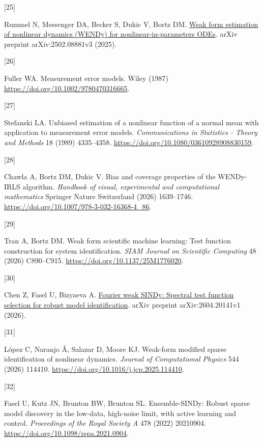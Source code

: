 \documentclass[ejs]{imsart}
\newlength{\cslhangindent}\setlength{\cslhangindent}{1.5em}
\newlength{\csllabelwidth}\setlength{\csllabelwidth}{3em}
\newenvironment{CSLReferences}[2]
 {\begin{list}{}{\setlength{\itemindent}{0pt}\setlength{\leftmargin}{0pt}\setlength{\parsep}{0pt}
 \ifodd #1\setlength{\leftmargin}{\cslhangindent}\setlength{\itemindent}{-1\cslhangindent}\fi
 \setlength{\itemsep}{#2\baselineskip}}}{\end{list}}
\newcommand{\CSLLeftMargin}[1]{\parbox[t]{\csllabelwidth}{\strut#1\strut}}
\newcommand{\CSLRightInline}[1]{\parbox[t]{\linewidth-\csllabelwidth}{\strut#1\strut}}
\begin{document}
\begin{CSLReferences}{0}{0}
\CSLLeftMargin{{[}25{]} }%
\CSLRightInline{Rummel N, Messenger DA, Becker S, Dukic V, Bortz DM.
\href{https://arxiv.org/abs/2502.08881v3}{Weak form estimation of
nonlinear dynamics ({WENDy}) for nonlinear-in-parameters {ODEs}}. arXiv
preprint arXiv:2502.08881v3 (2025).}

\CSLLeftMargin{{[}26{]} }%
\CSLRightInline{Fuller WA. Measurement error models. Wiley (1987)
\url{https://doi.org/10.1002/9780470316665}.}

\CSLLeftMargin{{[}27{]} }%
\CSLRightInline{Stefanski LA. Unbiased estimation of a nonlinear
function of a normal mean with application to measurement error models.
\emph{Communications in Statistics - Theory and Methods} 18 (1989)
4335--4358. \url{https://doi.org/10.1080/03610928908830159}.}

\CSLLeftMargin{{[}28{]} }%
\CSLRightInline{Chawla A, Bortz DM, Dukic V. Bias and coverage
properties of the {WENDy-IRLS} algorithm. \emph{Handbook of visual,
experimental and computational mathematics} Springer Nature Switzerland
(2026) 1639--1746. \url{https://doi.org/10.1007/978-3-032-16368-4_86}.}

\CSLLeftMargin{{[}29{]} }%
\CSLRightInline{Tran A, Bortz DM. Weak form scientific machine learning:
Test function construction for system identification. \emph{SIAM Journal
on Scientific Computing} 48 (2026) C890--C915.
\url{https://doi.org/10.1137/25M1776020}.}

\CSLLeftMargin{{[}30{]} }%
\CSLRightInline{Chen Z, Fasel U, Bizyaeva A.
\href{https://arxiv.org/abs/2604.20141v1}{Fourier weak {SINDy}: Spectral
test function selection for robust model identification}. arXiv preprint
arXiv:2604.20141v1 (2026).}

\CSLLeftMargin{{[}31{]} }%
\CSLRightInline{López C, Naranjo Á, Salazar D, Moore KJ. Weak-form
modified sparse identification of nonlinear dynamics. \emph{Journal of
Computational Physics} 544 (2026) 114410.
\url{https://doi.org/10.1016/j.jcp.2025.114410}.}

\CSLLeftMargin{{[}32{]} }%
\CSLRightInline{Fasel U, Kutz JN, Brunton BW, Brunton SL.
Ensemble-{SINDy}: Robust sparse model discovery in the low-data,
high-noise limit, with active learning and control. \emph{Proceedings of
the Royal Society A} 478 (2022) 20210904.
\url{https://doi.org/10.1098/rspa.2021.0904}.}


\end{CSLReferences}
\end{document}

